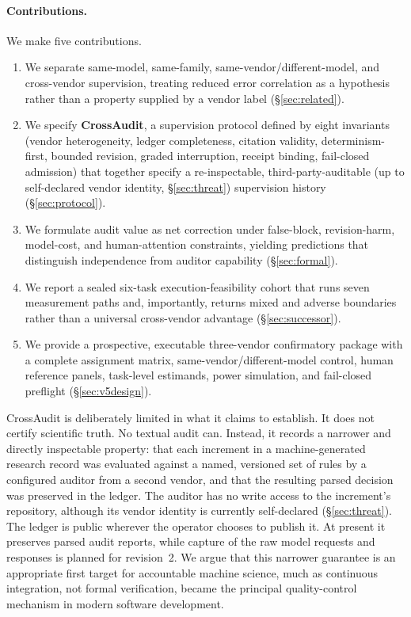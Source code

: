 \documentclass[11pt]{article}
\begin{document}
\paragraph{Contributions.} We make five contributions.
\begin{enumerate}[itemsep=1pt,topsep=3pt]
  \item We separate same-model, same-family, same-vendor/different-model, and cross-vendor supervision, treating reduced error correlation as a hypothesis rather than a property supplied by a vendor label (\S\ref{sec:related}).
  \item We specify \textbf{CrossAudit}, a supervision protocol defined by eight invariants (vendor heterogeneity, ledger completeness, citation validity, determinism-first, bounded revision, graded interruption, receipt binding, fail-closed admission) that together specify a re-inspectable, third-party-auditable (up to self-declared vendor identity, \S\ref{sec:threat}) supervision history (\S\ref{sec:protocol}).
  \item We formulate audit value as net correction under false-block, revision-harm, model-cost, and human-attention constraints, yielding predictions that distinguish independence from auditor capability (\S\ref{sec:formal}).
  \item We report a sealed six-task execution-feasibility cohort that runs seven measurement paths and, importantly, returns mixed and adverse boundaries rather than a universal cross-vendor advantage (\S\ref{sec:successor}).
  \item We provide a prospective, executable three-vendor confirmatory package with a complete assignment matrix, same-vendor/different-model control, human reference panels, task-level estimands, power simulation, and fail-closed preflight (\S\ref{sec:v5design}).
\end{enumerate}

CrossAudit is deliberately limited in what it claims to establish. It does not certify scientific truth. No textual audit can. Instead, it records a narrower and directly inspectable property: that each increment in a machine-generated research record was evaluated against a named, versioned set of rules by a configured auditor from a second vendor, and that the resulting parsed decision was preserved in the ledger. The auditor has no write access to the increment's repository, although its vendor identity is currently self-declared (\S\ref{sec:threat}). The ledger is public wherever the operator chooses to publish it. At present it preserves parsed audit reports, while capture of the raw model requests and responses is planned for revision~2. We argue that this narrower guarantee is an appropriate first target for accountable machine science, much as continuous integration, not formal verification, became the principal quality-control mechanism in modern software development.
\end{document}
